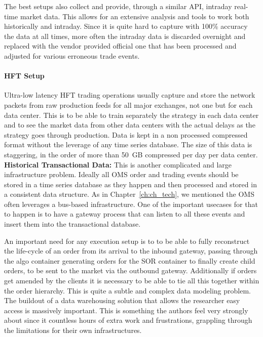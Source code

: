 The best setups also collect and provide, through a similar API, intraday real-time market data. This allows for an extensive analysis and tools to work both historically and intraday. Since it is quite hard to capture with 100\% accuracy the data at all times, more often the intraday data is discarded overnight and replaced with the vendor provided official one that has been processed and adjusted for various erroneous trade events. 


\paragraph{HFT Setup}

Ultra-low latency HFT trading operations usually capture and store the network packets from raw production feeds for all major exchanges, not one but for each data center. This is to be able to train separately the strategy in each data center and to see the market data from other data centers with the actual delays as the strategy goes through production. Data is kept in a non processed compressed format without the leverage of any time series database. The size of this data is staggering, in the order of more than 50~GB compressed per day per data center. \\



\noindent\textbf{Historical Transactional Data:} This is another complicated and large infrastructure problem. Ideally all OMS order and trading events should be stored in a time series database as they happen and then processed and stored in a consistent data structure. As in Chapter~\ref{ch:ch_tech}, we mentioned the OMS often leverages a bus-based infrastructure. One of the important usecases for that to happen is to have a gateway process that can listen to all these events and insert them into the transactional database.


An important need for any execution setup is to to be able to fully reconstruct the life-cycle of an order from its arrival to the inbound gateway, passing through the algo container generating orders for the SOR container to finally create child orders, to be sent to the market via the outbound gateway. Additionally if orders get amended by the clients it is necessary to be able to tie all this together within the order hierarchy. This is quite a subtle and complex data modeling problem. The buildout of a data warehousing solution that allows the researcher easy access is massively important. This is something the authors feel very strongly about since it countless hours of extra work and frustrations, grappling through the limitations for their own infrastructures.


